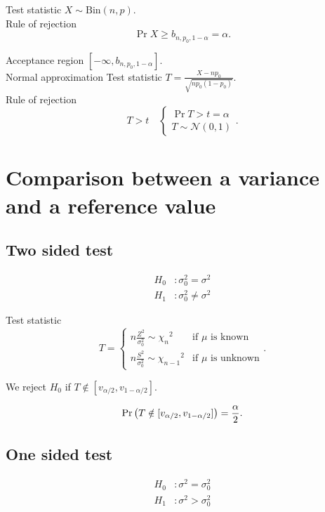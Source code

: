 \documentclass{report}
\begin{document}
Test statistic $X \sim \mathrm{Bin}(n,p)$.\\

Rule of rejection
\[
	\Pr{X\geq b_{n,p_0,1-\alpha}} = \alpha
	.\]

Acceptance region $[-\infty, b_{n,p_0,1-\alpha}]$.\\

Normal approximation
Test statistic $T = \frac{X - np_0}{\sqrt{np_0(1-p_0)}}$.\\

Rule of rejection
\[
	T > t \quad \begin{cases}
		\Pr{T>t} = \alpha \\
		T\sim \mathcal{N}(0,1)
	\end{cases}
	.\]

\section{Comparison between a variance and a reference value}

\subsection{Two sided test}

\begin{align*}
	H_0 & : \sigma_0^2 = \sigma^2    \\
	H_1 & : \sigma_0^2 \neq \sigma^2
\end{align*}

Test statistic
\[
	T = \begin{cases}
		n\frac{Z^2}{\sigma_0^2} \sim {\chi_{n}}^2   & \text{if } \mu \text{ is known}   \\
		n\frac{S^2}{\sigma_0^2} \sim {\chi_{n-1}}^2 & \text{if } \mu \text{ is unknown}
	\end{cases}
	.\]

We reject $H_0$ if $T \notin [v_{\alpha/2}, v_{1-\alpha/2}]$.

\[
	\Pr{T \notin [v_{\alpha/2}, v_{1-\alpha/2}]} = \frac{\alpha}{2}\\
	.\]

\subsection{One sided test}

\begin{align*}
	H_0 & : \sigma^2 = \sigma_0^2 \\
	H_1 & : \sigma^2 > \sigma_0^2
\end{align*}
\end{document}
